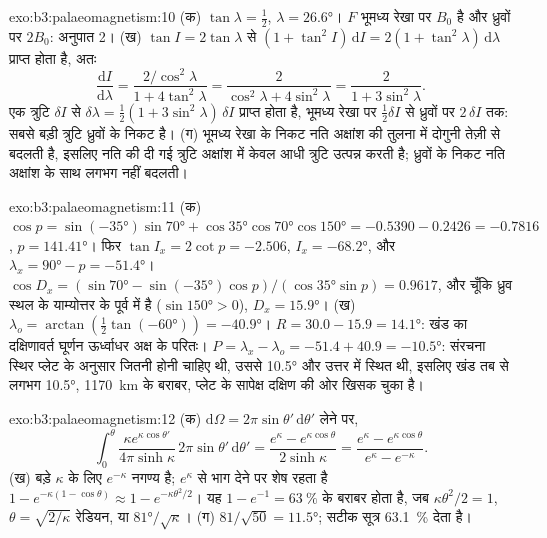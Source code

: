 \begin{solution}{exo:b3:palaeomagnetism:10}
(क) $\tan\lambda = \tfrac12$, $\lambda = \ang{26.6}$। $F$ भूमध्य रेखा पर $B_0$ है और
ध्रुवों पर $2B_0$: अनुपात 2। (ख) $\tan I = 2\tan\lambda$ से
$(1 + \tan^2I)\,\mathrm dI = 2(1 + \tan^2\lambda)\,\mathrm d\lambda$ प्राप्त होता है, अतः
\[
  \frac{\mathrm dI}{\mathrm d\lambda} = \frac{2/\cos^2\lambda}{1 + 4\tan^2\lambda}
  = \frac{2}{\cos^2\lambda + 4\sin^2\lambda} = \frac{2}{1 + 3\sin^2\lambda}.
\]
एक त्रुटि $\delta I$ से $\delta\lambda = \tfrac12(1 + 3\sin^2\lambda)\,\delta I$ प्राप्त होता है,
भूमध्य रेखा पर $\tfrac12\delta I$ से ध्रुवों पर $2\,\delta I$ तक: सबसे बड़ी
त्रुटि ध्रुवों के निकट है। (ग) भूमध्य रेखा के निकट नति अक्षांश की तुलना में
दोगुनी तेज़ी से बदलती है, इसलिए नति की दी गई त्रुटि अक्षांश में
केवल आधी त्रुटि उत्पन्न करती है; ध्रुवों के निकट नति अक्षांश के साथ लगभग नहीं बदलती।
\end{solution}

\begin{solution}{exo:b3:palaeomagnetism:11}
(क) $\cos p = \sin(\ang{-35})\sin\ang{70} + \cos\ang{35}\cos\ang{70}\cos\ang{150}
= -0.5390 - 0.2426 = -0.7816$, $p = \ang{141.41}$। फिर $\tan I_x = 2\cot p =
-2.506$, $I_x = \ang{-68.2}$, और $\lambda_x = \ang{90} - p = \ang{-51.4}$।
$\cos D_x = (\sin\ang{70} - \sin(\ang{-35})\cos p)/(\cos\ang{35}\sin p) =
0.9617$, और चूँकि ध्रुव स्थल के याम्योत्तर के पूर्व में है ($\sin\ang{150} >
0$), $D_x = \ang{15.9}$। (ख) $\lambda_o = \arctan(\tfrac12\tan(\ang{-60})) =
\ang{-40.9}$। $R = 30.0 - 15.9 = \ang{14.1}$: खंड का दक्षिणावर्त घूर्णन
ऊर्ध्वाधर अक्ष के परितः। $P = \lambda_x - \lambda_o = -51.4 + 40.9 =
\ang{-10.5}$: संरचना स्थिर प्लेट के अनुसार जितनी होनी चाहिए थी, उससे
\ang{10.5} और उत्तर में स्थित थी, इसलिए खंड तब से लगभग \ang{10.5},
\qty{1170}{km} के बराबर, प्लेट के सापेक्ष दक्षिण की ओर खिसक चुका है।
\end{solution}

\begin{solution}{exo:b3:palaeomagnetism:12}
(क) $\mathrm d\Omega = 2\pi\sin\theta'\,\mathrm d\theta'$ लेने पर,
\[
  \int_0^\theta\frac{\kappa e^{\kappa\cos\theta'}}{4\pi\sinh\kappa}\,2\pi\sin\theta'\,
  \mathrm d\theta' = \frac{e^\kappa - e^{\kappa\cos\theta}}{2\sinh\kappa}
  = \frac{e^\kappa - e^{\kappa\cos\theta}}{e^\kappa - e^{-\kappa}} .
\]
(ख) बड़े $\kappa$ के लिए $e^{-\kappa}$ नगण्य है; $e^\kappa$ से भाग देने पर
शेष रहता है $1 - e^{-\kappa(1 - \cos\theta)} \approx 1 - e^{-\kappa\theta^2/2}$। यह
$1 - e^{-1} = \qty{63}{\percent}$ के बराबर होता है, जब $\kappa\theta^2/2 = 1$, $\theta =
\sqrt{2/\kappa}$ रेडियन, या $\ang{81}/\sqrt\kappa$। (ग) $81/\sqrt{50} =
\ang{11.5}$; सटीक सूत्र \qty{63.1}{\percent} देता है।
\end{solution}

